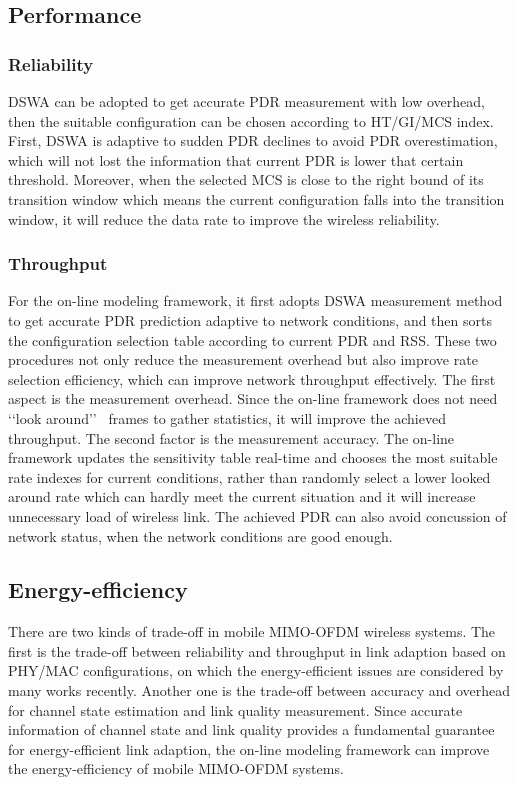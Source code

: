 \documentclass[draftclsnofoot,journal,onecolumn,11pt]{IEEEtran}
\begin{document}
\subsection{Performance}

\subsubsection{Reliability}

DSWA can be adopted to get accurate PDR measurement with low overhead, then the suitable configuration can be chosen according to HT/GI/MCS index. First, DSWA is adaptive to sudden PDR declines to avoid PDR overestimation, which will not lost the information that current PDR is lower that certain threshold. Moreover, when the selected MCS is close to the right bound of its transition window which means the current configuration falls into the transition window, it will reduce the data rate to improve the wireless reliability.

\subsubsection{Throughput}

For the on-line modeling framework, it first adopts DSWA measurement method to get accurate PDR prediction adaptive to network conditions, and then sorts the configuration selection table according to current PDR and RSS. These two procedures not only reduce the measurement overhead but also improve rate selection efficiency, which can improve network throughput effectively. The first aspect is the measurement overhead. Since the on-line framework does not need \lq\lq look around\rq\rq~ frames to gather statistics, it will improve the achieved throughput. The second factor is the measurement accuracy. The on-line framework updates the sensitivity table real-time and chooses the most suitable rate indexes for current conditions, rather than randomly select a lower looked around rate which can hardly meet the current situation and it will increase unnecessary load of wireless link. The achieved PDR can also avoid concussion of network status, when the network conditions are good enough.

\subsection{Energy-efficiency}
There are two kinds of trade-off in mobile MIMO-OFDM wireless systems. The first is the trade-off between reliability and throughput in link adaption based on PHY/MAC configurations, on which the energy-efficient issues are considered by many works recently. Another one is the trade-off between accuracy and overhead for channel state estimation and link quality measurement. Since accurate information of channel state and link quality provides a fundamental guarantee for energy-efficient link adaption, the on-line modeling framework can improve the energy-efficiency of mobile MIMO-OFDM systems.


\renewcommand\refname{References}
%


\end{document}
